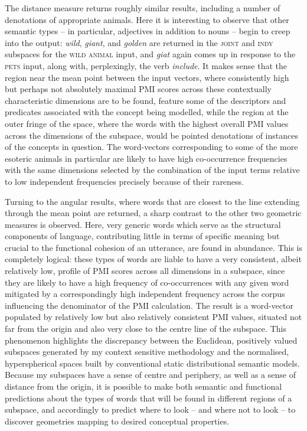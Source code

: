 The distance measure returns roughly similar results, including a number of denotations of appropriate animals.  Here it is interesting to observe that other semantic types -- in particular, adjectives in addition to nouns -- begin to creep into the output: \emph{wild}, \emph{giant}, and \emph{golden} are returned in the \textsc{joint} and \textsc{indy} subspaces for the \textsc{wild animal} input, and \emph{giat} again comes up in response to the \textsc{pets} input, along with, perplexingly, the verb \emph{include}.  It makes sense that the region near the mean point between the input vectors, where consistently high but perhaps not absolutely maximal PMI scores across these contextually characteristic dimensions are to be found, feature some of the descriptors and predicates associated with the concept being modelled, while the region at the outer fringe of the space, where the words with the highest overall PMI values across the dimensions of the subspace, would be pointed denotations of instances of the concepts in question.  The word-vectors corresponding to some of the more esoteric animals in particular are likely to have high co-occurrence frequencies with the same dimensions selected by the combination of the input terms relative to low independent frequencies precisely because of their rareness.

Turning to the angular results, where words that are closest to the line extending through the mean point are returned, a sharp contrast to the other two geometric measures is observed.  Here, very generic words which serve as the structural components of language, contributing little in terms of specific meaning but crucial to the functional cohesion of an utterance, are found in abundance.  This is completely logical: these types of words are liable to have a very consistent, albeit relatively low, profile of PMI scores across all dimensions in a subspace, since they are likely to have a high frequency of co-occurrences with any given word mitigated by a correspondingly high independent frequency across the corpus influencing the denominator of the PMI calculation.  The result is a word-vector populated by relatively low but also relatively consistent PMI values, situated not far from the origin and also very close to the centre line of the subspace.  This phenomenon highlights the discrepancy between the Euclidean, positively valued subspaces generated by my context sensitive methodology and the normalised, hyperspherical spaces built by conventional static distributional semantic models.  Because my subspaces have a sense of centre and periphery, as well as a sense of distance from the origin, it is possible to make both semantic and functional predictions about the types of words that will be found in different regions of a subspace, and accordingly to predict where to look -- and where not to look -- to discover geometries mapping to desired conceptual properties.

